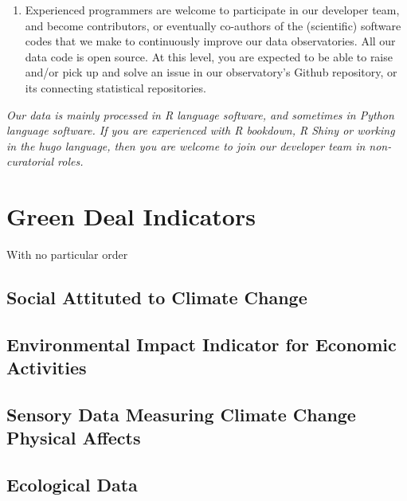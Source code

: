 \documentclass[
  a4paper,
  openany, a4paper, oneside]{book}
\begin{document}
\begin{enumerate}
\item
  Experienced programmers are welcome to participate in our developer team, and become contributors, or eventually co-authors of the (scientific) software codes that we make to continuously improve our data observatories. All our data code is open source. At this level, you are expected to be able to raise and/or pick up and solve an issue in our observatory's Github repository, or its connecting statistical repositories.
\end{enumerate}

\emph{Our data is mainly processed in R language software, and sometimes in Python language software. If you are experienced with R bookdown, R Shiny or working in the hugo language, then you are welcome to join our developer team in non-curatorial roles.}

\hypertarget{green-deal}{%
\chapter{Green Deal Indicators}\label{green-deal}}

With no particular order

\hypertarget{social-attituted-to-climate-change}{%
\section{Social Attituted to Climate Change}\label{social-attituted-to-climate-change}}

\hypertarget{environmental-impact-indicator-for-economic-activities}{%
\section{Environmental Impact Indicator for Economic Activities}\label{environmental-impact-indicator-for-economic-activities}}

\hypertarget{sensory-data-measuring-climate-change-physical-affects}{%
\section{Sensory Data Measuring Climate Change Physical Affects}\label{sensory-data-measuring-climate-change-physical-affects}}

\hypertarget{ecological-data}{%
\section{Ecological Data}\label{ecological-data}}
\end{document}
